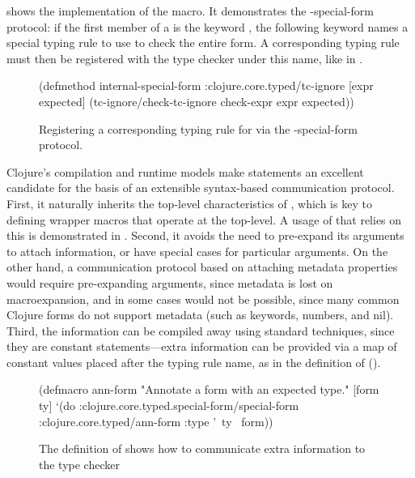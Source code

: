  shows the implementation of the  macro.
It demonstrates the -special-form protocol:
if the first member of a  is the keyword
,
the following keyword names a special typing rule to use
to check the entire form.
A corresponding typing rule must then be registered with the type checker under this name,
like in .

\begin{figure}
\begin{cljlisting}
(defmethod internal-special-form :clojure.core.typed/tc-ignore
  [expr expected]
  (tc-ignore/check-tc-ignore check-expr expr expected))
\end{cljlisting}
  \caption{Registering a corresponding typing rule for  via the -special-form protocol.}
  \label{fig:analyzer:tc-ignore-do-op}
\end{figure}

Clojure's compilation and runtime models make  statements an excellent candidate for the basis of
an extensible syntax-based communication protocol.
First, it naturally inherits the top-level characteristics of , which is key to defining
wrapper macros that operate at the top-level.
A usage of  that relies on this is demonstrated in .
Second, it avoids the need to pre-expand its arguments to attach information, or
have special cases for particular arguments.
On the other hand, a communication protocol based on attaching metadata properties
would require pre-expanding arguments, since metadata is lost on macroexpansion,
and in some cases would not be possible, since many common Clojure forms do not support metadata
(such as keywords, numbers, and nil).
Third, the information can be compiled away using standard techniques,
since they are constant statements---extra information can be provided via a map of constant values
placed after the typing rule name, as in
the definition of  ().

\begin{figure}
\begin{cljlisting}
(defmacro ann-form
  "Annotate a form with an expected type."
  [form ty]
  `(do :clojure.core.typed.special-form/special-form
       :clojure.core.typed/ann-form
       {:type '~ty}
       ~form))
\end{cljlisting}
  \caption{The definition of  shows how to communicate extra information to the type checker}
  \label{fig:analyzer:ann-form-definition}
\end{figure}

